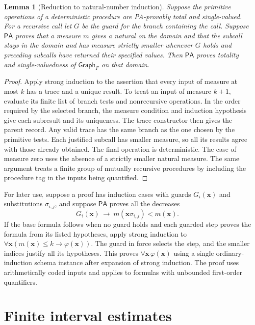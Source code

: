 \documentclass[11pt]{amsart}
\newtheorem{lemma}[theorem]{Lemma}
\theoremstyle{definition}
\theoremstyle{remark}
\numberwithin{equation}{section}
\newcommand{\PA}{\mathsf{PA}}
\newcommand{\Gph}{\mathsf{Graph}}
\begin{document}
\begin{lemma}[Reduction to natural-number induction]\label{lem:recursion}
Suppose the primitive operations of a deterministic procedure are
PA-provably total and single-valued. For a recursive call let $G$ be
the guard for the branch containing the call. Suppose $\PA$ proves that
a measure $m$ gives a natural on the domain and that the subcall
stays in the domain and has measure strictly smaller whenever $G$
holds and preceding subcalls have returned their specified values.
Then $\PA$ proves totality and single-valuedness of $\Gph_F$ on
that domain.
\end{lemma}
\begin{proof}
Apply strong induction to the assertion that every input of measure
at most $k$ has a trace and a unique result. To treat an input of
measure $k+1$, evaluate its finite list of branch tests and
nonrecursive operations. In the order required by the selected
branch, the measure condition and induction hypothesis give each
subresult and its uniqueness. The trace constructor then gives the
parent record. Any valid trace has the same branch as the one chosen
by the primitive tests. Each justified subcall has smaller measure,
so all its results agree with those already obtained. The final
operation is deterministic. The case of measure zero uses the absence
of a strictly smaller natural measure. The same argument treats a finite
group of mutually recursive procedures by including the procedure tag
in the inputs being quantified.
\end{proof}

For later use, suppose a proof has induction cases with guards
$G_i(\mathbf x)$ and substitutions $\sigma_{i,j}$, and suppose $\PA$
proves all the decreases
\[
 G_i(\mathbf x)\ \longrightarrow\
 m(\mathbf x\sigma_{i,j})<m(\mathbf x).
\]
If the base formula follows when no guard holds and each guarded
step proves the formula from its listed hypotheses, apply strong
induction to $\forall\mathbf x(m(\mathbf x)\le k\to\varphi(\mathbf x))$.
The guard in force selects the step, and the smaller indices justify
all its hypotheses. This proves $\forall\mathbf x\,\varphi(\mathbf x)$
using a single ordinary-induction schema instance after expansion of
strong induction. The proof uses arithmetically coded inputs and
applies to formulas with unbounded first-order quantifiers.

\section{Finite interval estimates}
\end{document}

